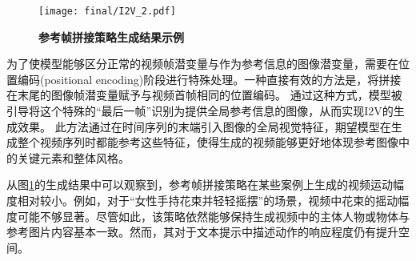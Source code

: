 \begin{figure}[htbp]
\centering
\texttt{[image: final/I2V\_2.pdf]}
\caption{\textbf{参考帧拼接策略生成结果示例}%
}
\label{I2V_2}
\end{figure}
为了使模型能够区分正常的视频帧潜变量与作为参考信息的图像潜变量，需要在位置编码(positional encoding)阶段进行特殊处理。一种直接有效的方法是，将拼接在末尾的图像帧潜变量赋予与视频首帧相同的位置编码。
通过这种方式，模型被引导将这个特殊的“最后一帧”识别为提供全局参考信息的图像，从而实现I2V的生成效果。
此方法通过在时间序列的末端引入图像的全局视觉特征，期望模型在生成整个视频序列时都能参考这些特征，使得生成的视频能够更好地体现参考图像中的关键元素和整体风格。

从图\ref{I2V_2}的生成结果中可以观察到，参考帧拼接策略在某些案例上生成的视频运动幅度相对较小。例如，对于“女性手持花束并轻轻摇摆”的场景，视频中花束的摇动幅度可能不够显著。尽管如此，该策略依然能够保持生成视频中的主体人物或物体与参考图片内容基本一致。然而，其对于文本提示中描述动作的响应程度仍有提升空间。\\

